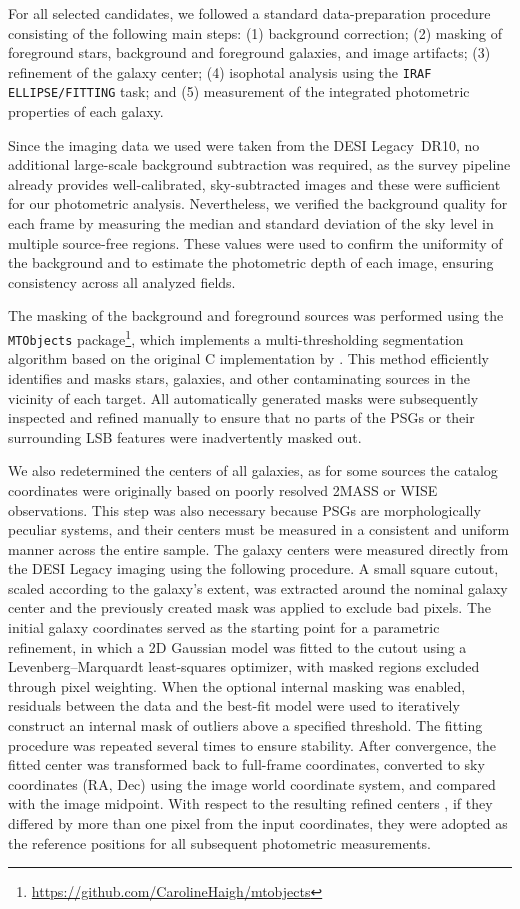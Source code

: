 \documentclass{aa}
\begin{document}
For all selected candidates, we followed a standard data-preparation procedure consisting of the following main steps: (1) background correction; (2) masking of foreground stars, background and foreground galaxies, and image artifacts; (3) refinement of the galaxy center; (4) isophotal analysis using the \texttt{IRAF ELLIPSE/FITTING} task; and (5) measurement of the integrated photometric properties of each galaxy.

Since the imaging data we used were taken from the DESI Legacy~DR10, no additional large-scale background subtraction was required, as the survey pipeline already provides well-calibrated, sky-subtracted images and these were sufficient for our photometric analysis. Nevertheless, we verified the background quality for each frame by measuring the median and standard deviation of the sky level in multiple source-free regions. These values were used to confirm the uniformity of the background and to estimate the photometric depth of each image, ensuring consistency across all analyzed fields.

The masking of the background and foreground sources was performed using the \texttt{MTObjects} package\footnote{\url{https://github.com/CarolineHaigh/mtobjects}}, which implements a multi-thresholding segmentation algorithm based on the original C implementation by \citet{teeninga2015improved}. This method efficiently identifies and masks stars, galaxies, and other contaminating sources in the vicinity of each target. All automatically generated masks were subsequently inspected and refined manually to ensure that no parts of the PSGs or their surrounding LSB features were inadvertently masked out.

We also redetermined the centers of all galaxies, as for some sources the catalog coordinates were originally based on poorly resolved 2MASS \citep{2006AJ....131.1163S} or WISE \citep{2010AJ....140.1868W} observations. This step was also necessary because PSGs are morphologically peculiar systems, and their centers must be measured in a consistent and uniform manner across the entire sample. The galaxy centers were measured directly from the DESI Legacy imaging using the following procedure. A small square cutout, scaled according to the galaxy’s extent, was extracted around the nominal galaxy center and the previously created mask was applied to exclude bad pixels. The initial galaxy coordinates served as the starting point for a parametric refinement, in which a 2D Gaussian model was fitted to the cutout using a Levenberg–Marquardt least-squares optimizer, with masked regions excluded through pixel weighting. When the optional internal masking was enabled, residuals between the data and the best-fit model were used to iteratively construct an internal mask of outliers above a specified threshold. The fitting procedure was repeated several times to ensure stability. After convergence, the fitted center was transformed back to full-frame coordinates, converted to sky coordinates (RA, Dec) using the image world coordinate system, and compared with the image midpoint. With respect to the resulting refined centers , if they differed by more than one pixel from the input coordinates, they were adopted as the reference positions for all subsequent photometric measurements.
\end{document}
